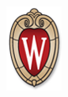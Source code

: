 \documentclass[letterpaper,10pt,english]{sphinxmanual}
\begin{document}
\begin{description}
\includegraphics{crest.png}

\end{description}



\renewcommand{\indexname}{Index}
\printindex
\end{document}

